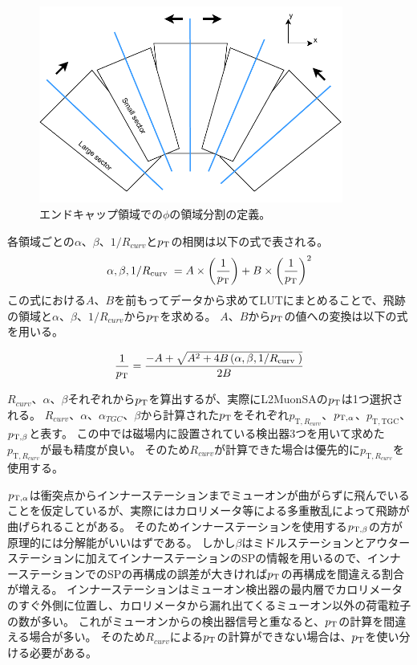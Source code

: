 \begin{figure}[h]
  \centering
  \includegraphics[clip, width=10cm]{fig/3/LUT_binning.pdf}
  \caption{エンドキャップ領域での$\phi$の領域分割の定義。}
  \label{fig:3-10}
\end{figure}

各領域ごとの$\alpha$、$\beta$、$1/R_{curv}$と$p_\mathrm{T}$の相関は以下の式で表される。
\begin{equation}
    \alpha, \beta, 1 / R_{\text {curv }}=A \times\left(\frac{1}{p_\mathrm{T}}\right)+B \times\left(\frac{1}{p_\mathrm{T}}\right)^2
\end{equation}
この式における$A$、$B$を前もってデータから求めてLUTにまとめることで、飛跡の領域と$\alpha$、$\beta$、$1/R_{curv}$から$p_\mathrm{T}$を求める。
$A$、$B$から$p_\mathrm{T}$の値への変換は以下の式を用いる。

\begin{equation}
    \frac{1}{p_\mathrm{T}}=\frac{-A+\sqrt{A^2+4 B\left(\alpha, \beta, 1 / R_{\text {curv }}\right)}}{2 B}
\end{equation}

$R_{curv}$、$\alpha$、$\beta$それぞれから$p_\mathrm{T}$を算出するが、実際にL2MuonSAの$p_\mathrm{T}$は1つ選択される。
$R_{curv}$、$\alpha$、$\alpha_{TGC}$、$\beta$から計算された$p_\mathrm{T}$をそれぞれ$p_{\mathrm{T},R_{curv}}$、$p_{\mathrm{T}, \alpha}$、$p_{\mathrm{T,TGC}}$、$p_{\mathrm{T}, \beta}$と表す。
この中では磁場内に設置されている検出器3つを用いて求めた$p_{\mathrm{T},R_{curv}}$が最も精度が良い。
そのため$R_{curv}$が計算できた場合は優先的に$p_{\mathrm{T},R_{curv}}$を使用する。

$p_{\mathrm{T}, \alpha}$は衝突点からインナーステーションまでミューオンが曲がらずに飛んでいることを仮定しているが、実際にはカロリメータ等による多重散乱によって飛跡が曲げられることがある。
そのためインナーステーションを使用する$p_{\mathrm{T}, \beta}$の方が原理的には分解能がいいはずである。
しかし$\beta$はミドルステーションとアウターステーションに加えてインナーステーションのSPの情報を用いるので、インナーステーションでのSPの再構成の誤差が大きければ$p_\mathrm{T}$の再構成を間違える割合が増える。
インナーステーションはミューオン検出器の最内層でカロリメータのすぐ外側に位置し、カロリメータから漏れ出てくるミューオン以外の荷電粒子の数が多い。
これがミューオンからの検出器信号と重なると、$p_\mathrm{T}$の計算を間違える場合が多い。
そのため$R_{curv}$による$p_\mathrm{T}$の計算ができない場合は、$p_\mathrm{T}$を使い分ける必要がある。

